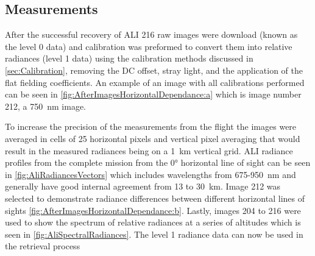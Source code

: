 \documentclass[12pt]{article}
\begin{document}

\subsection{Measurements}

After the successful recovery of ALI 216 raw images were download (known as the level 0 data) and calibration was preformed to convert them into relative radiances (level 1 data) using the calibration methods discussed in \autoref{sec:Calibration}, removing the DC offset, stray light,  and the application of the flat fielding coefficients. An example of an image with all calibrations performed can be seen in \autoref{fig:AfterImagesHorizontalDependance:a} which is image number 212, a 750~nm image. 

To increase the precision of the measurements from the flight the images were averaged in cells of 25 horizontal pixels and vertical pixel averaging that would result in the measured radiances being on a 1~km vertical grid.  ALI radiance profiles from the complete mission from the 0\si{\degree} horizontal line of sight can be seen in \autoref{fig:AliRadiancesVectors} which includes wavelengths from 675-950~nm and generally have good internal agreement from 13 to 30~km. Image 212 was selected to demonstrate radiance differences between different horizontal lines of sights \autoref{fig:AfterImagesHorizontalDependance:b}. Lastly, images 204 to 216 were used to show the spectrum of relative radiances at a series of altitudes which is seen in \autoref{fig:AliSpectralRadiances}. The level 1 radiance data can now be used in the retrieval process

\end{document}
